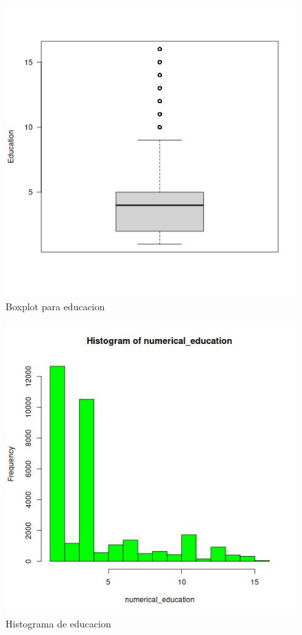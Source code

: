 \documentclass[10pt,twocolumn,a4paper]{article}
\begin{document}
\begin{figure}
    \includegraphics[width=\linewidth]{images/boxplot_education.jpeg}
    \caption{Boxplot para educacion}
    \label{fig:boxplot_education}
\end{figure}

\begin{figure}
    \includegraphics[width=\linewidth]{images/hist_education.jpeg}
    \caption{Histograma de educacion}
    \label{fig:hist_education}
\end{figure}
\end{document}

